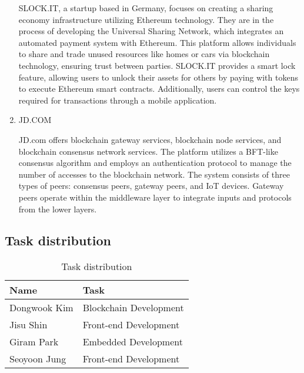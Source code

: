 \documentclass[conference]{IEEEtran}
\begin{document}
\begin{enumerate}[itemsep=2ex, parsep=1ex]
	      
	      SLOCK.IT, a startup based in Germany, focuses on creating a sharing economy infrastructure utilizing Ethereum technology. They are in the process of developing the Universal Sharing Network, which integrates an automated payment system with Ethereum. This platform allows individuals to share and trade unused resources like homes or cars via blockchain technology, ensuring trust between parties. SLOCK.IT provides a smart lock feature, allowing users to unlock their assets for others by paying with tokens to execute Ethereum smart contracts. Additionally, users can control the keys required for transactions through a mobile application.
	      
	      
	\item JD.COM
	      
	      
	      JD.com offers blockchain gateway services, blockchain node services, and blockchain consensus network services. The platform utilizes a BFT-like consensus algorithm and employs an authentication protocol to manage the number of accesses to the blockchain network. The system consists of three types of peers: consensus peers, gateway peers, and IoT devices. Gateway peers operate within the middleware layer to integrate inputs and protocols from the lower layers.
	      
	       
\end{enumerate}

\vspace{3cm}

\subsection{Task distribution }

\begin{table}[h]
	\caption{Task distribution}
	\def\arraystretch{1.4} \small
	\begin{tabular}{|p{3cm}|p{4.6cm}|}
		\hline
		Name         & Task                   \\ \hline
		
		Dongwook Kim & Blockchain Development 
		\\ \hline
		
		Jisu Shin    & Front-end Development  
		\\ \hline
		
		Giram Park   & Embedded Development   
		\\ \hline
		
		Seoyoon Jung & Front-end Development  
		\\ \hline
		
	\end{tabular}
\end{table}
\end{document}
